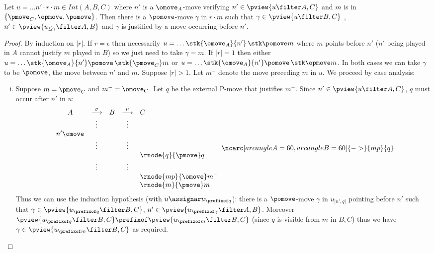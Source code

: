 \begin{lemma}
\label{lem:middlepomove}
Let $u = \ldots n' \cdot r \cdot m \in Int(A,B,C)$ where
$n'$ is a $\omove_A$-move verifying $n' \in \pview{u\filter A,C}$ and $m$ is in $\{ \pmove_C, \opmove, \pomove \}$. Then there is a $\pomove$-move $\gamma$ in $r \cdot m$ such that $\gamma \in \pview{u\filter B,C}$ , $n' \in \pview{u_{\leq \gamma} \filter A,B}$ and $\gamma$ is justified by a move occurring before $n'$.
\end{lemma}
\begin{proof}
By induction on $|r|$.
If $r=\epsilon$ then necessarily $u = \ldots \stk{\omove_A}{n'} \thinspace\stk \pomove m$ where $m$ points before $n'$ ($n'$ being played in $A$ cannot justify $m$ played in $B$) so we just need to take $\gamma = m$.
If $|r|=1$ then either 
$u = \ldots \stk{\omove_A}{n'} \pomove\thinspace\stk {\pmove_C} m$
or $u = \ldots \stk{\omove_A}{n'} \pomove\thinspace\stk \opmove m$.
In both cases we can take $\gamma$ to be $\pomove$, the move between $n'$ and $m$.
Suppose $|r|>1$. Let $m^-$ denote the move preceding $m$ in $u$.
We proceed by case analysis:
\begin{enumerate}[i.]
\item Suppose $m = \pmove_C$ and $m^- = \omove_C$.
Let $q$ be the external P-move that justifies $m^-$.
Since $n' \in \pview{u\filter A,C}$, $q$ must occur after $n'$ in $u$:
$$ 
\begin{array}{ccccl}
A & \stackrel\sigma{\longrightarrow} & B & \stackrel\mu{\longrightarrow} & C \\
&\vdots&&\vdots\\
n' \omove\\
&\vdots&&\vdots  \\
&& & &  \rnode{q}{\pmove}q  \\
&\vdots&&\vdots  \\
&& & &  \rnode{mp}{\omove}m^-  \\
&& & &  \rnode{m}{\pmove}m  \\
\end{array}
\ncarc[arcangleA=60,arcangleB=60]{->}{mp}{q}
 $$  
Thus we can use the induction hypothesis (with $u\assignar u_{\prefixof q}$): there is a $\pomove$-move $\gamma$ 
in $u_{]n',q]}$ pointing before $n'$ such that $\gamma \in \pview{u_{\prefixof q} \filter B,C}$, $n' \in \pview{u_{\prefixof \gamma} \filter A,B}$.
Moreover $\pview{u_{\prefixof q} \filter B,C} \prefixof \pview{u_{\prefixof m} \filter B,C}$ (since $q$ is visible from $m$ in $B,C$) thus we have $\gamma \in \pview{u_{\prefixof m} \filter B,C}$ as required.


\end{enumerate}
\end{proof}
